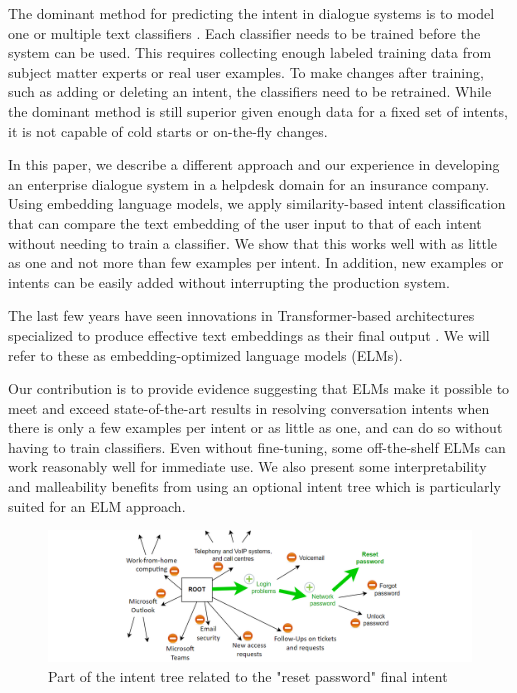 \documentclass[sigconf, anonymous=true]{acmart}
\begin{document}
The dominant method for predicting the intent in dialogue systems is to model one or multiple text classifiers \cite{intent_classification_for_dialogue_uterances}. Each classifier needs to be trained before the system can be used. This requires collecting enough labeled training data from subject matter experts or real user examples. To make changes after training, such as adding or deleting an intent, the classifiers need to be retrained. While the dominant method is still superior given enough data for a fixed set of intents, it is not capable of cold starts or on-the-fly changes. 

In this paper, we describe a different approach and our experience in developing an enterprise dialogue system in a helpdesk domain for an insurance company. Using embedding language models, we apply similarity-based intent classification that can compare the text embedding of the user input to that of each intent without needing to train a classifier. We show that this works well with as little as one and not more than few examples per intent. In addition, new examples or intents can be easily added without interrupting the production system.

The last few years have seen innovations in Transformer-based architectures specialized to produce effective text embeddings as their final output \citep{cer2018universal, reimers-2019-sentence-bert, gao2021simcse}. We will refer to these as embedding-optimized language models (ELMs). 

Our contribution is to provide evidence suggesting that ELMs make it possible to meet and exceed state-of-the-art results in resolving conversation intents when there is only a few examples per intent or as little as one, and can do so without having to train classifiers. Even without fine-tuning, some off-the-shelf ELMs can work reasonably well for immediate use. We also present some interpretability and malleability benefits from using an optional intent tree which is particularly suited for an ELM approach. 


\begin{figure}[ht]
  \includegraphics[width=\textwidth]{pic/figure1.PNG}
  \centering
  \caption{Part of the intent tree related to the "reset password" final intent}
\end{figure}
\end{document}
